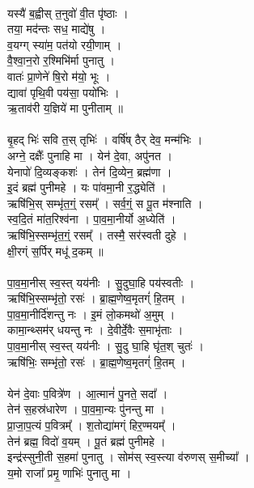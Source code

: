 \\
यस्यै॑ ब॒ह्वीस् त॒नुवो॑ वी॒त पृ॑ष्ठाः ।\\
तया॒ मद॑न्तः सध॒ माद्ये॑षु ।\\
व॒यग्ग् स्या॑म॒ पत॑यो रयी॒णाम् ।\\
वै॒श्वा॒न॒रो र॒श्मिभि॑र्मा पुनातु ।\\
वातः॑ प्रा॒णेने॑ षि॒रो म॑यो॒ भूः ।\\
द्यावा॑ पृथि॒वी पय॑सा॒ पयो॑भिः ।\\
ऋ॒ताव॑री य॒ज्ञिये॑ मा पुनीताम् ॥\\
\\
बृ॒हद् भिः॑ सवि त॒स् तृभिः॑ । वर्षि॑ष् ठैर् देव॒ मन्म॑भिः । \\
अग्ने॒ दक्षैः᳚ पुनाहि मा । येन॑ दे॒वा, अपु॑नत । \\
येनापो॑ दि॒व्यङ्कशः॑ । तेन॑ दि॒व्येन॒ ब्रह्म॑णा । \\
इ॒दं ब्रह्म॑ पुनीमहे । यः पा॑वमा॒नी र॒द्ध्येति॑ । \\
ऋषि॑भि॒स् सम्भृ॑त॒ग्ं॒ रसम्᳚ । सर्व॒ग्ं॒ स पू॒त म॑श्नाति । \\
स्व॒दि॒तं मा॑त॒रिश्व॑ना । पा॒व॒मा॒नीर्यो अ॒ध्येति॑ । \\
ऋषि॑भि॒स्सम्भृ॑त॒ग्ं॒ रसम्᳚ । तस्मै॒ सर॑स्वती दुहे । \\
क्षी॒रग्ं स॒र्पिर् मधू॑ द॒कम् ॥\\
\\
पा॒व॒मा॒नीस् स्व॒स्त् यय॑नीः । सु॒दुघा॒हि पय॑स्वतीः । \\
ऋषि॑भि॒स्सम्भृ॑तो॒ रसः॑ । ब्रा॒ह्म॒णेष्व॒मृतग्ं॑ हि॒तम् । \\
पा॒व॒मा॒नीर्दि॑शन्तु नः । इ॒मं लो॒कमथो॑ अ॒मुम् । \\
कामा॒न्थ्सम॑र् धयन्तु नः । दे॒वी‍र्दे॒वैः स॒माभृ॑ताः । \\
पा॒व॒मा॒नीस् स्व॒स्त् यय॑नीः । सु॒दु घा॒हि घृ॑त॒श् चुतः॑ । \\
ऋषि॑भिः॒ सम्भृ॑तो॒ रसः॑ । ब्रा॒ह्म॒णेष्व॒मृतग्ं॑ हि॒तम् । \\
\\
येन॑ दे॒वाः प॒वित्रे॑ण । आ॒त्मानं॑ पु॒नते॒ सदा᳚ । \\
तेन॑ स॒हस्र॑धारेण । पा॒व॒मा॒न्यः पु॑नन्तु मा । \\
प्रा॒जा॒प॒त्यं प॒वित्रम्᳚ । श॒तोद्या॑मग्ं हिर॒ण्मयम्᳚ । \\
तेन॑ ब्रह्म॒ विदो॑ व॒यम् । पू॒तं ब्रह्म॑ पुनीमहे । \\
इन्द्र॑स्सुनी॒ती स॒हमा॑ पुनातु । सोम॑स् स्व॒स्त्या व॑रुणस् स॒मीच्या᳚ । \\
य॒मो राजा᳚ प्रमृ॒ णाभिः॑ पुनातु मा । \\
